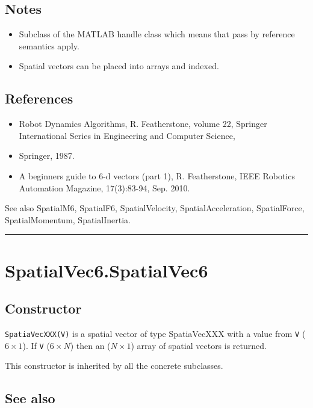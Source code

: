 \subsection*{Notes}
\begin{itemize}
  \item Subclass of the MATLAB handle class which means that pass by reference semantics    apply.
  \item Spatial vectors can be placed into arrays and indexed.
\end{itemize}

\subsection*{References}
\begin{itemize}
  \item Robot Dynamics Algorithms, R. Featherstone, volume 22,     Springer International Series in Engineering and Computer Science,
  \item Springer, 1987.
  \item A beginner\textquotesingle s guide to 6-d vectors (part 1), R. Featherstone,     IEEE Robotics Automation Magazine, 17(3):83-94, Sep. 2010.
\end{itemize}


See also SpatialM6, SpatialF6, SpatialVelocity, SpatialAcceleration, SpatialForce,
SpatialMomentum, SpatialInertia.

\vspace{1.5ex}\hrule

\hypertarget{SpatialVec6.SpatialVec6}{\section*{SpatialVec6.SpatialVec6}}
\subsection*{Constructor}


\texttt{SpatiaVecXXX(V)} is a spatial vector of type SpatiaVecXXX with a value
from \texttt{V} ($6 \times 1$).  If \texttt{V} ($6 \times N$) then an ($N \times 1$) array of spatial vectors is
returned.



This constructor is inherited by all the concrete subclasses.


\subsection*{See also}


